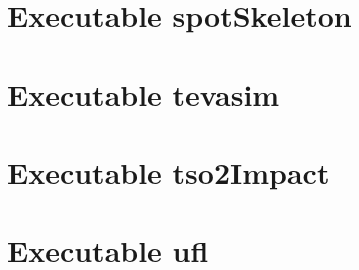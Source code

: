 \chapter{Executable spotSkeleton}\label{skelExecutable}
 
\newpage
\chapter{Executable tevasim}\label{tevasimExecutable}

\newpage
\chapter{Executable tso2Impact}\label{tso2ImpactExecutable}

\newpage
\chapter{Executable ufl}\label{lagrangianExecutable}



